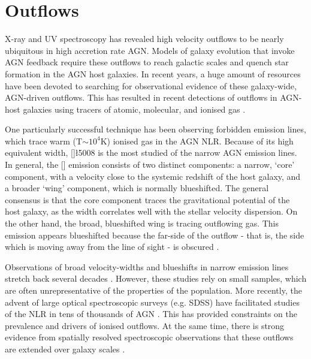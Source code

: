 \section{Outflows}

X-ray and UV spectroscopy has revealed high velocity outflows to be nearly ubiquitous in high accretion rate AGN.
Models of galaxy evolution that invoke AGN feedback require these outflows to reach galactic scales and quench star formation in the AGN host galaxies. 
In recent years, a huge amount of resources have been devoted to searching for observational evidence of these galaxy-wide, AGN-driven outflows. 
This has resulted in recent detections of outflows in AGN-host galaxies using tracers of atomic, molecular, and ionised gas \citep[e.g.][]{nesvadba06,arav08,nesvadba08,moe09,dunn10,alexander10,harrison12,harrison14,nesvadba10,rupke13,veilleux13,nardini15,feruglio10,alatalo11,cimatti13,cicone14}.  

One particularly successful technique has been observing forbidden emission lines, which trace warm (T$\sim$$10^4$K) ionised gas in the AGN NLR. 
Because of its high equivalent width, []\l5008 is the most studied of the narrow AGN emission lines. 
In general, the [] emission consists of two distinct components: a narrow, `core' component, with a velocity close to the systemic redshift of the host galaxy, and a broader `wing' component, which is normally blueshifted. 
The general consensus is that the core component traces the gravitational potential of the host galaxy, as the width correlates well with the stellar velocity dispersion. 
On the other hand, the broad, blueshifted wing is tracing outflowing gas. 
This emission appears blueshifted because the far-side of the outflow - that is, the side which is moving away from the line of sight - is obscured \citep[e.g.][]{heckman81,vrtilek85}. 

Observations of broad velocity-widths and blueshifts in narrow emission lines stretch back several decades \citep[e.g.][]{weedman70,stockton76,heckman81,veron81,feldman82,heckman84,vrtilek85,whittle85,boroson92}. 
However, these studies rely on small samples, which are often unrepresentative of the properties of the population. 
More recently, the advent of large optical spectroscopic surveys (e.g. SDSS) have facilitated studies of the NLR in tens of thousands of AGN \citep[e.g.][]{boroson05,greene05a,zhang11,mullaney13,zakamska14,shen14}. 
This has provided constraints on the prevalence and drivers of ionised outflows.   
At the same time, there is strong evidence from spatially resolved spectroscopic observations that these outflows are extended over galaxy scales \citep[e.g.][]{greene09,greene11,hainline13,harrison12,harrison14}. 

